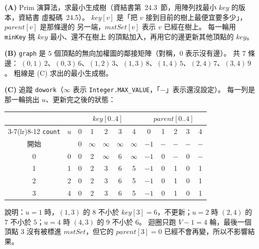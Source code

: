\begin{pastsoln}
\textbf{(A)} Prim 演算法，求最小生成樹（資結書第~24.3~節，用陣列找最小 $\mathit{key}$ 的版本，資結書
虛擬碼~24.5）。 $\mathit{key}[v]$ 是「把 $v$ 接到目前的樹上最便宜要多少」，$\mathit{parent}[v]$ 是那條邊的
另一端，$\mathit{mstSet}[v]$ 表示 $v$ 已經在樹上。 每一輪用 \texttt{minKey} 挑 $\mathit{key}$ 最小、還不在樹上
的頂點加入，再用它的邊更新其他頂點的 $\mathit{key}$。

\textbf{(B)} \texttt{graph} 是 $5$ 個頂點的無向加權圖的鄰接矩陣（對稱，$0$ 表示沒有邊）。 共 $7$ 條邊：
$(0,1)\,2$、$(0,3)\,6$、$(1,2)\,3$、$(1,3)\,8$、$(1,4)\,5$、$(2,4)\,7$、$(3,4)\,9$。 粗線是 (C) 求出的最小生成樹。

\begin{center}
\end{center}

\textbf{(C)} 追蹤 \texttt{dowork}（$\infty$ 表示 \texttt{Integer.MAX\_VALUE}，「$-$」表示還沒設定）。 每一列是
那一輪挑出 $u$、更新完之後的狀態：
\begin{center}
\small
\begin{tabular}{cc ccccc ccccc}
\toprule
& & \multicolumn{5}{c}{$\mathit{key}[0..4]$} & \multicolumn{5}{c}{$\mathit{parent}[0..4]$} \\
\cmidrule(lr){3-7}\cmidrule(lr){8-12}
\texttt{count} & $u$ & 0 & 1 & 2 & 3 & 4 & 0 & 1 & 2 & 3 & 4 \\
\midrule
開始 & & 0 & $\infty$ & $\infty$ & $\infty$ & $\infty$ & $-1$ & $-$ & $-$ & $-$ & $-$ \\
0 & 0 & 0 & 2 & $\infty$ & 6 & $\infty$ & $-1$ & 0 & $-$ & 0 & $-$ \\
1 & 1 & 0 & 2 & 3 & 6 & 5 & $-1$ & 0 & 1 & 0 & 1 \\
2 & 2 & 0 & 2 & 3 & 6 & 5 & $-1$ & 0 & 1 & 0 & 1 \\
3 & 4 & 0 & 2 & 3 & 6 & 5 & $-1$ & 0 & 1 & 0 & 1 \\
\bottomrule
\end{tabular}
\end{center}
說明：$u = 1$ 時，$(1,3)$ 的 $8$ 不小於 $\mathit{key}[3] = 6$，不更新；$u = 2$ 時 $(2,4)$ 的 $7$ 不小於
$5$；$u = 4$ 時 $(4,3)$ 的 $9$ 不小於 $6$。 迴圈只跑 $V - 1 = 4$ 輪，最後一個頂點 $3$ 沒有被標進
$\mathit{mstSet}$，但它的 $\mathit{parent}[3] = 0$ 已經不會再變，所以不影響結果。


\end{pastsoln}

